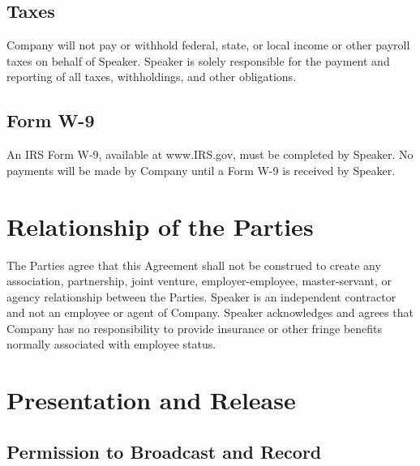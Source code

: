 \documentclass[a4paper,12pt]{article} %
\begin{document}
\subsection{Taxes}

Company will not pay or withhold federal, state, or local income or other payroll taxes on behalf of Speaker. Speaker is solely responsible for the payment and reporting of all taxes, withholdings, and other obligations.

\subsection{Form W-9}

An IRS Form W-9, available at www.IRS.gov, must be completed by Speaker. No payments will be made by Company until a Form W-9 is received by Speaker.


\section{Relationship of the Parties}

The Parties agree that this Agreement shall not be construed to create any association, partnership, joint venture, employer-employee, master-servant, or agency relationship between the Parties. Speaker is an independent contractor and not an employee or agent of Company. Speaker acknowledges and agrees that Company has no responsibility to provide insurance or other fringe benefits normally associated with employee status.


\section{Presentation and Release}

\subsection{Permission to Broadcast and Record}
\end{document}
